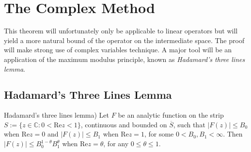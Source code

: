 \section{The Complex Method}
This theorem will unfortunately only be applicable to linear operators but will yield a more natural bound of the operator on the intermediate space. The proof will make strong use of complex variables technique. A major tool will be an application of the maximum modulus principle, known as \emph{Hadamard's three lines lemma}.

\subsection{Hadamard's Three Lines Lemma}

\begin{mdframed}
	\begin{lemma}{Hadamard's three lines lemma)}
		Let $F$ be an analytic function on the strip $S := \{z \in \mathbb{C}: 0 < \mathrm{Re}z < 1\}$, continuous and bounded on $\overline{S}$, such that $\vert F(z)\vert \leqslant B_0$ when $\mathrm{Re}z = 0$ and $\vert F(z) \vert \leqslant B_1$ when $\mathrm{Re}z = 1$, for some $0 < B_0,B_1 < \infty$. Then $\vert F(z) \vert \leqslant B_0^{1 - \theta}B_1^\theta$ when $\mathrm{Re}z = \theta$, for any $0 \leqslant \theta \leqslant 1$.
		\label{lemma:HTL}
	\end{lemma}
\end{mdframed}
				
\vspace{2mm}


